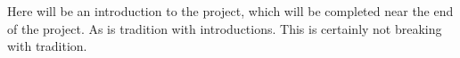 Here will be an introduction to the project, which will be completed near the end of the project. As is tradition with introductions.
This is certainly not breaking with tradition.





